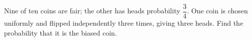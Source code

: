 Nine of ten coins are fair; the other has heads probability $\dfrac{3}{4}$. One coin is chosen uniformly and flipped independently three times, giving three heads. Find the probability that it is the biased coin.
